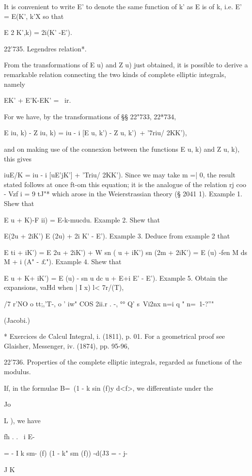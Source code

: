 It is convenient to write E' to denote the same function of k' as E is
of k, i.e. E' = E(K', k'X so that

E 2 K',k) = 2i(K' -E').

22'735. Legendres relation*.

From the transformations of E u) and Z u) just obtained, it is
possible to derive a remarkable relation connecting the two kinds of
complete elliptic integrals, namely

EK' + E'K-EK' = \ ir.

For we have, by the transformations of §§ 22"733, 22*734,

E iu, k) - Z iu, k) = iu - i [E u, k') - Z u, k')\ + '7riu/ 2KK'),

and on making use of the connexion between the functions E u, k) and Z
u, k), this gives

iuE/K = iu - i [uE'jK'] + 'Triu/ 2KK'). Since we may take m =| 0, the
result stated follows at once ft-om this equation; it is the analogue
of the relation rj coo - Vzf i = 9 tJ"* which arose in the
Weierstrassian theory (§ 2041 1). Example 1. Shew that

E u + K)-F ii) = E-k-mucdu. Example 2. Shew that

E(2u + 2iK') E (2u) + 2i K' - E'). Example 3. Deduce from example 2
that

E ti + iK') = E 2u + 2iK') + W sn ( u + iK') sn (2m + 2iK') = E (u)
-fen M ds M + i (A" - £"). Example 4. Shew that

E u + K+ iK') = E (u) - sn u dc u + E+i E' - E'). Example 5. Obtain
the expansions, vaHd when | I x) l< 7r/(T),

/7 r'NO o tt;,'T-, o ' iw" COS 2ii.r . -, °° Q' s\ Vi2nx n=i q " n=\
1-?''"

(Jacobi.)

* Exercices de Calcul Integral, i. (1811), p. 01. For a geometrical
proof see Glaisher, Messenger, iv. (1874), pp. 95-96,

%
%

22'736. Properties of the complete elliptic integrals, regarded as
functions of the modulus.

If, in the formulae B=\ (1 - k sin (f)y d<f>, we differentiate under
the

Jo

L ), we have

fh . . \ i E-

= - I k sm- (f) (1 - k" sm (f)) -d(J3 = - j-

J K

